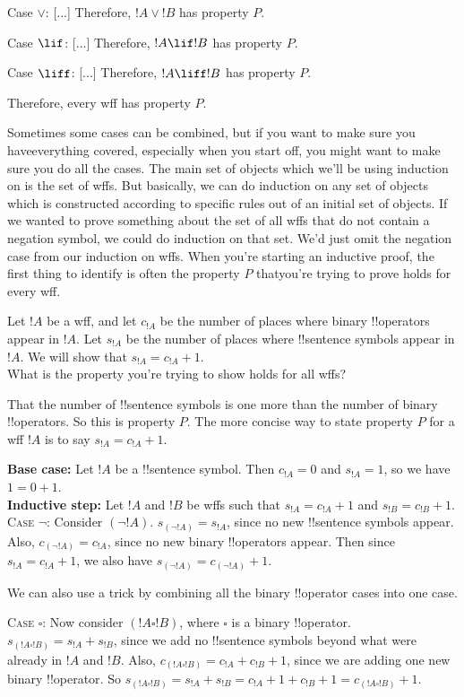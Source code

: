 \documentclass[../../../include/open-logic-section]{subfiles}
\begin{document}
\begin{explain}
Case $\lor$: [...] Therefore, $!A \lor !B$ has property $P$.

Case $\lif$: [...] Therefore, $!A \lif !B$ has property $P$.

Case $\liff$: [...] Therefore, $!A \liff !B$ has
property $P$.

Therefore, every wff has property $P$.

Sometimes some cases can be combined, but if you want to make sure you
haveeverything covered, especially when you start off, you might want to
make
sure you do all the cases. The main set of objects which we'll be using
induction on is the set of wffs. But basically, we can do induction on any
set of objects which is constructed according to specific rules out of an
initial set of objects.
If we wanted to prove something about the set of all wffs that do not
contain a negation symbol, we could do induction on that set. We'd just
omit the negation case from our induction on wffs. When you're starting an
inductive proof, the first thing to identify is often the property $P$
thatyou're trying to prove holds for every wff.
\end{explain}

\begin{ex}
Let $!A$ be a wff, and let $c_{!A}$ be the number of
    places where binary !!{operator}s appear in $!A$. Let
    $s_{!A}$ be the number of places where !!{sentence} symbols appear
in $!A$. We will show that $s_{!A} = c_{!A} + 1$.\\

What is the property you're trying to show holds for all wffs?

That the number of !!{sentence} symbols is one more than the number of
binary !!{operator}s. So this is property $P$. The more concise way to
state property $P$ for a wff $!A$ is to say $s_{!A} = c_{!A} + 1$.

\textbf{Base case:} Let $!A$ be a !!{sentence} symbol. Then $c_{!A} = 0$
and $s_{!A} = 1$, so we have $1 = 0 + 1$.\\
\textbf{Inductive step:} Let $!A$ and $!B$ be wffs such that
$s_{!A}
= c_{!A} + 1$ and $s_{!B} = c_{!B} + 1$.\\
\textsc{Case $\lnot$:} Consider $(\lnot !A)$. $s_{(\lnot !A)} =
s_{!A}$, since no new !!{sentence} symbols appear. Also, $c_{(\lnot !A)} =
c_{!A}$, since no new binary !!{operator}s appear. Then since $s_{!A} =
c_{!A} + 1$, we also have $s_{(\lnot !A)} = c_{(\lnot !A)} +
1$.

We can also use a trick by combining all the binary !!{operator} cases
into one case.

\textsc{Case $\square$:} Now consider $(!A \square !B)$, where
$\square$ is a binary !!{operator}. $s_{(!A \square !B)} = s_{!A} +
s_{!B}$, since we add no !!{sentence} symbols beyond what were already in
$!A$ and $!B$. Also, $c_{(!A \square !B)} = c_{!A} +
c_{!B} + 1$, since we are adding one new binary !!{operator}. So $s_{(!A
\square !B)} = s_{!A} + s_{!B} = c_{!A} + 1 + c_{!B} + 1 =
c_{(!A \square !B)} + 1$.
\end{ex}
\end{document}

